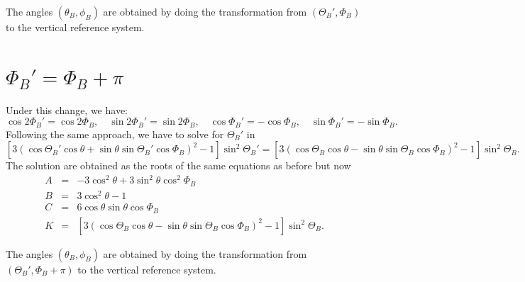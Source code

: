 \documentclass[12pt]{article}
\begin{document}
The angles $(\theta_B,\phi_B)$ are obtained by doing the transformation from $(\Theta_B',\Phi_B)$ to the
vertical reference system.

\section{\texorpdfstring{$\Phi_B' = \Phi_B+\pi$}{PhiB'=PhiB+pi}}
Under this change, we have:
\begin{equation}
\cos 2\Phi_B' = \cos 2\Phi_B, \quad \sin 2\Phi_B' = \sin 2\Phi_B, \quad \cos \Phi_B' = -\cos \Phi_B, \quad \sin \Phi_B' = -\sin \Phi_B.
\end{equation}
Following the same approach, we have to solve for $\Theta_B'$ in 
\begin{equation}
\left[ 3 \left( \cos \Theta_B' \cos \theta + \sin\theta \sin\Theta_B' \cos\Phi_B\right)^2-1 \right] \sin^2 \Theta_B' = 
\left[ 3 \left( \cos \Theta_B \cos \theta - \sin\theta \sin\Theta_B \cos\Phi_B\right)^2-1 \right] \sin^2 \Theta_B.
\end{equation}
The solution are obtained as the roots of the same equations as before but now
\begin{eqnarray}
A &=& -3\cos^2 \theta + 3\sin^2 \theta \cos^2 \Phi_B \nonumber \\
B &=& 3\cos^2 \theta - 1 \nonumber \\
C &=& 6 \cos\theta \sin\theta \cos \Phi_B \nonumber \\
K &=& \left[ 3 \left( \cos \Theta_B \cos \theta - \sin\theta \sin\Theta_B \cos\Phi_B\right)^2-1 \right] \sin^2 \Theta_B.
\end{eqnarray}

The angles $(\theta_B,\phi_B)$ are obtained by doing the transformation from $(\Theta_B',\Phi_B+\pi)$ to the
vertical reference system.
\end{document}
